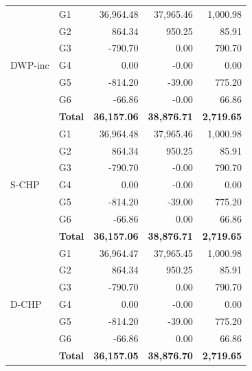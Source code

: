 \begin{tabular}{llrrr}
\midrule
\multirow{7}{*}{DWP-inc} & G1 & 36,964.48 & 37,965.46 & 1,000.98 \\
 & G2 & 864.34 & 950.25 & 85.91 \\
 & G3 & -790.70 & 0.00 & 790.70 \\
 & G4 & 0.00 & -0.00 & 0.00 \\
 & G5 & -814.20 & -39.00 & 775.20 \\
 & G6 & -66.86 & -0.00 & 66.86 \\
 & \textbf{Total} & \textbf{36,157.06} & \textbf{38,876.71} & \textbf{2,719.65} \\
\midrule
\multirow{7}{*}{S-CHP} & G1 & 36,964.48 & 37,965.46 & 1,000.98 \\
 & G2 & 864.34 & 950.25 & 85.91 \\
 & G3 & -790.70 & -0.00 & 790.70 \\
 & G4 & 0.00 & -0.00 & 0.00 \\
 & G5 & -814.20 & -39.00 & 775.20 \\
 & G6 & -66.86 & 0.00 & 66.86 \\
 & \textbf{Total} & \textbf{36,157.06} & \textbf{38,876.71} & \textbf{2,719.65} \\
\midrule
\multirow{7}{*}{D-CHP} & G1 & 36,964.47 & 37,965.45 & 1,000.98 \\
 & G2 & 864.34 & 950.25 & 85.91 \\
 & G3 & -790.70 & 0.00 & 790.70 \\
 & G4 & 0.00 & -0.00 & 0.00 \\
 & G5 & -814.20 & -39.00 & 775.20 \\
 & G6 & -66.86 & 0.00 & 66.86 \\
 & \textbf{Total} & \textbf{36,157.05} & \textbf{38,876.70} & \textbf{2,719.65} \\
\bottomrule
\end{tabular}
